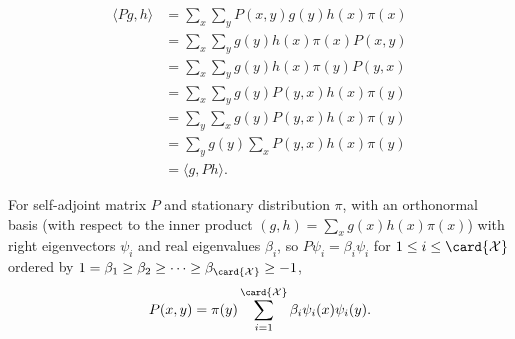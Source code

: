 \documentclass[12pt]{article}
\begin{document}
\begin{solution}
    \begin{align*}
        \langle Pg, h \rangle &= \sum_x \sum_y P(x,y)g(y) h(x) \pi(x) \\
        &= \sum_x \sum_y g(y) h(x) \pi(x) P(x,y) \\
        &= \sum_x \sum_y g(y) h(x) \pi(y) P(y,x) \\
        &= \sum_x \sum_y g(y) P(y,x)h(x) \pi(y) \\
        &= \sum_y \sum_x g(y) P(y,x)h(x) \pi(y) \\
        &= \sum_y g(y) \sum_x P(y,x)h(x) \pi(y) \\
        &= \langle g, Ph \rangle.
    \end{align*}
\end{solution}
\begin{exercise}
    For self-adjoint matrix \( P \) and stationary distribution \( \pi \),
    with an orthonormal basis (with respect to the inner product \( (g,h)
    = \sum\limits_{x}g(x) h(x) \pi(x) \)) with right eigenvectors \(
    \psi_i \) and real eigenvalues \( \beta_i \), so \( P\psi_i = \beta_i
    \psi_i \) for \( 1 \le i \le \card{\mathcal{X}} \) ordered by \( 1 =
    \beta_1 \ge \beta_2 \ge \cdots \ge \beta_{\card{\mathcal{X}}} \ge -1
    \),
    \[
        P(x,y) = \pi(y) \sum\limits_{i=1}^{\card{\mathcal{X}}} \beta_i
        \psi_i(x) \psi_i(y).
    \]
\end{exercise}
\end{document}
